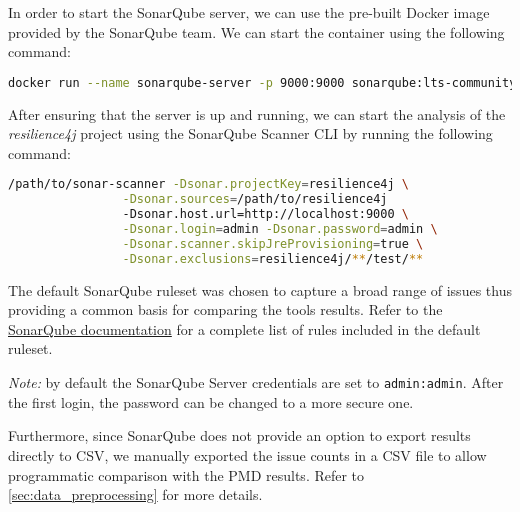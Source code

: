 In order to start the SonarQube server, we can use the pre-built Docker image provided by the SonarQube team. We can start the container using the following command:

\begin{lstlisting}[language=bash, caption={Starting the SonarQube server}]
docker run --name sonarqube-server -p 9000:9000 sonarqube:lts-community
\end{lstlisting}

\noindent After ensuring that the server is up and running, we can start the analysis of the \textit{resilience4j} project using the SonarQube Scanner CLI by running the following command:

\begin{lstlisting}[language=bash, caption={Command to run SonarQube analysis on \textit{resilience4j} project codebase}]
              /path/to/sonar-scanner -Dsonar.projectKey=resilience4j \
                -Dsonar.sources=/path/to/resilience4j 
                -Dsonar.host.url=http://localhost:9000 \
                -Dsonar.login=admin -Dsonar.password=admin \
                -Dsonar.scanner.skipJreProvisioning=true \
                -Dsonar.exclusions=resilience4j/**/test/**
\end{lstlisting}

The default SonarQube ruleset was chosen to capture a broad range of issues thus providing a common basis for comparing the tools results. Refer to the \href{https://docs.sonarqube.org/latest/analysis/languages/java/}{SonarQube documentation} for a complete list of rules included in the default ruleset.

\noindent \textit{Note:} by default the SonarQube Server credentials are set to \texttt{admin:admin}. After the first login, the password can be changed to a more secure one.

Furthermore, since SonarQube does not provide an option to export results directly to CSV, we manually exported the issue counts in a CSV file to allow programmatic comparison with the PMD results. Refer to \autoref{sec:data_preprocessing} for more details.
